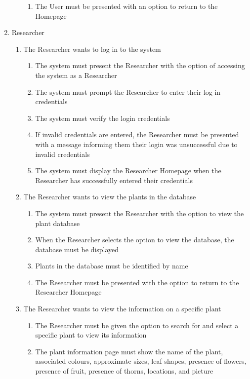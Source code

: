 \documentclass[]{article}
\begin{document}
\begin{enumerate}[{VP}1.]
\begin{enumerate}[{BE1}.1]
\begin{enumerate}
		    \item The User must be presented with an option to return to the Homepage
		\end{enumerate}
	\end{enumerate}
	\item Researcher
	\begin{enumerate}[{BE2}.1]
		\item The Researcher wants to log in to the system
		\begin{enumerate}
			\item The system must present the Researcher with the option of accessing the system as a Researcher
			\item The system must prompt the Researcher to enter their log in credentials
			\item The system must verify the login credentials
			\item If invalid credentials are entered, the Researcher must be presented with a message informing them their login was unsuccessful due to invalid credentials
			\item The system must display the Researcher Homepage when the Researcher has successfully entered their credentials
		\end{enumerate}
		\item The Researcher wants to view the plants in the database
		\begin{enumerate}
			\item The system must present the Researcher with the option to view the plant database
			\item When the Researcher selects the option to view the database, the database must be displayed
			\item Plants in the database must be identified by name
			\item The Researcher must be presented with the option to return to the Researcher Homepage
		\end{enumerate}
		\item The Researcher wants to view the information on a specific plant
		\begin{enumerate}
		    \item The Researcher must be given the option to search for and select a specific plant to view its information
		    \item The plant information page must show the name of the plant, associated colours, approximate sizes, leaf shapes,  presence of flowers, presence of fruit, presence of thorns, locations, and picture

\end{enumerate}
\end{enumerate}
\end{enumerate}
\end{document}
